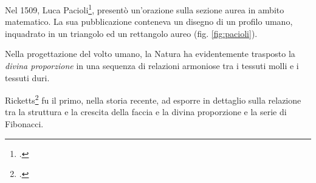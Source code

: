 Nel 1509, Luca Pacioli\footcite{Pacioli1509}, presentò un'orazione sulla sezione aurea in ambito matematico. La sua pubblicazione conteneva un disegno di un profilo umano, inquadrato in un triangolo ed un rettangolo aureo (fig. \vref{fig:pacioli}).

Nella progettazione del volto umano, la Natura ha evidentemente trasposto la \textit{divina proporzione} in una sequenza di relazioni armoniose tra i tessuti molli e i tessuti duri. %

Ricketts\footcite{Ricketts1982,Ricketts1982a} fu il primo, nella storia recente, ad esporre in dettaglio sulla relazione tra la struttura e la crescita della faccia e la divina proporzione e la serie di Fibonacci.
